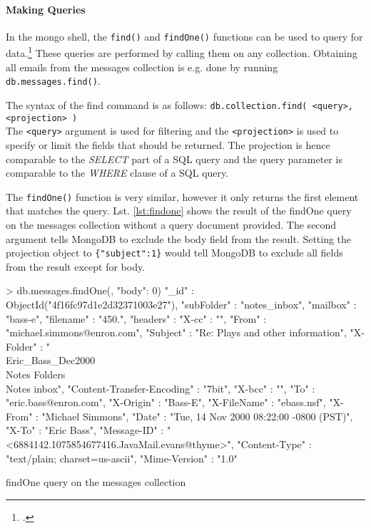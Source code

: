 \paragraph{Making Queries}
In the mongo shell, the \texttt{find()} and \texttt{findOne()} functions can be used to
query for data.\footcite[Cf.][7]{mongo_crud_manual}
These queries are performed by calling them on any collection.
Obtaining all emails from the messages collection is e.g. done by running
\texttt{db.messages.find()}.

The syntax of the find command is as follows: \texttt{db.collection.find(
<query>, <projection> )}\\
The \texttt{<query>} argument is used for filtering and the \texttt{<projection>} is used to specify
or limit the fields that should be returned.
The projection is hence comparable to the \textit{SELECT} part of a SQL query and the
query parameter is comparable to the \textit{WHERE} clause of a SQL query.


The \texttt{findOne()} function is very similar, however it only returns the first
element that matches the query. Lst. \ref{lst:findone} shows the result of the
findOne query on the messages collection without a query document provided. The
second argument tells MongoDB to exclude the body field from the result. Setting
the projection object to \texttt{\{"subject":1\}} would tell MongoDB to exclude
all fields from the result except for body.

\begin{listing}
    \begin{javascriptcode}
> db.messages.findOne({}, {"body": 0})
{
    "_id" : ObjectId("4f16fc97d1e2d32371003e27"),
    "subFolder" : "notes_inbox",
    "mailbox" : "bass-e",
    "filename" : "450.",
    "headers" : {
        "X-cc" : "",
        "From" : "michael.simmons@enron.com",
        "Subject" : "Re: Plays and other information",
        "X-Folder" : "\\Eric_Bass_Dec2000\\Notes Folders\\Notes inbox",
        "Content-Transfer-Encoding" : "7bit",
        "X-bcc" : "",
        "To" : "eric.bass@enron.com",
        "X-Origin" : "Bass-E",
        "X-FileName" : "ebass.nsf",
        "X-From" : "Michael Simmons",
        "Date" : "Tue, 14 Nov 2000 08:22:00 -0800 (PST)",
        "X-To" : "Eric Bass",
        "Message-ID" : "<6884142.1075854677416.JavaMail.evans@thyme>",
        "Content-Type" : "text/plain; charset=us-ascii",
        "Mime-Version" : "1.0"
    }
}
    \end{javascriptcode}
    \caption{findOne query on the messages collection}
    \label{lst:findone}
\end{listing}

